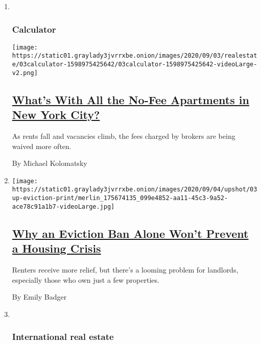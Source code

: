 \begin{enumerate}
\def\labelenumi{\arabic{enumi}.}
\item ~
  \hypertarget{calculator}{%
  \subsubsection{Calculator}\label{calculator}}

  \texttt{[image: https://static01.graylady3jvrrxbe.onion/images/2020/09/03/realestate/03calculator-1598975425642/03calculator-1598975425642-videoLarge-v2.png]}

  \hypertarget{whats-with-all-the-no-fee-apartments-in-new-york-city}{%
  \subsection{\texorpdfstring{\href{/2020/09/03/realestate/no-fee-apartments-new-york-city-coronavirus.html}{What's
  With All the No-Fee Apartments in New York
  City?}}{What's With All the No-Fee Apartments in New York City?}}\label{whats-with-all-the-no-fee-apartments-in-new-york-city}}

  As rents fall and vacancies climb, the fees charged by brokers are
  being waived more often.

  By Michael Kolomatsky
\item
  \texttt{[image: https://static01.graylady3jvrrxbe.onion/images/2020/09/04/upshot/03up-eviction-print/merlin\_175674135\_099e4852-aa11-45c3-9a52-ace78c91a1b7-videoLarge.jpg]}

  \hypertarget{why-an-eviction-ban-alone-wont-prevent-a-housing-crisis}{%
  \subsection{\texorpdfstring{\href{/2020/09/03/upshot/eviction-moratarium-rent-crisis.html}{Why
  an Eviction Ban Alone Won't Prevent a Housing
  Crisis}}{Why an Eviction Ban Alone Won't Prevent a Housing Crisis}}\label{why-an-eviction-ban-alone-wont-prevent-a-housing-crisis}}

  Renters receive more relief, but there's a looming problem for
  landlords, especially those who own just a few properties.

  By Emily Badger
\item ~
  \hypertarget{international-real-estate}{%
  \subsubsection{International real
  estate}\label{international-real-estate}}


\end{enumerate}
